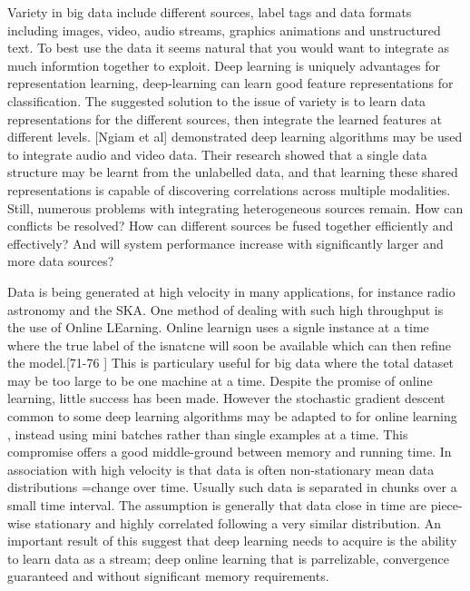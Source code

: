 Variety in big data include different sources, label tags and data formats including images, video, audio streams, graphics animations and unstructured text.
To best use the data it seems natural that you would want to integrate as much informtion together to exploit.
Deep learning is uniquely advantages for representation learning, deep-learning can learn good feature representations for classification.
The suggested solution to the issue of variety is to learn data representations for the different sources, then integrate the learned features at different levels.
[Ngiam et al] demonstrated deep learning algorithms may be used to integrate audio and video data.
Their research showed that a single data structure may be learnt from the unlabelled data, and that learning these shared representations is capable of discovering correlations across multiple modalities.
Still, numerous problems with integrating heterogeneous sources remain.
How can conflicts be resolved?
How can different sources be fused together efficiently and effectively?
And will system performance increase with significantly larger and more data sources?

Data is being generated at high velocity in many applications, for instance radio astronomy and the SKA.
One method of dealing with such high throughput is the use of Online LEarning.
Online learnign uses a signle instance at a time where the true label of the isnatcne will soon be available which can then refine the model.[71-76 \citep{chen2014big}]
This is particulary useful for big data where the total dataset may be too large to be one machine at a time.
Despite the promise of online learning, little success has been made.
However the stochastic gradient descent common to some deep learning algorithms may be adapted to for online learning , instead using mini batches rather than single examples at a time.
This compromise offers a good middle-ground between memory and running time.
In association with high velocity is that data is often non-stationary mean data distributions =change over time.
Usually such data is separated in chunks over a small time interval.
The assumption is generally that data close in time are piece-wise stationary and highly correlated following a very similar distribution.
An important result of this suggest that deep learning needs to acquire is the ability to learn data as a stream; deep online learning that is parrelizable, convergence guaranteed and without significant memory requirements.




